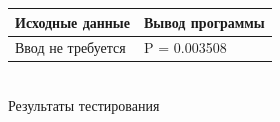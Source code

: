 \documentclass[a4paper,14pt]{extarticle}
\begin{document}

\begin{center}
\begin{tabular}{|p{7cm}|p{7cm}|}
\hline
\multicolumn{1}{|c|}{Исходные данные}& \multicolumn{1}{|c|}{Вывод программы}\\
\hline
Ввод не требуется & P = 0.003508\\
\hline
\end{tabular}\\
\vspace{0.3cm}
Результаты тестирования
\end{center}
\end{document}
